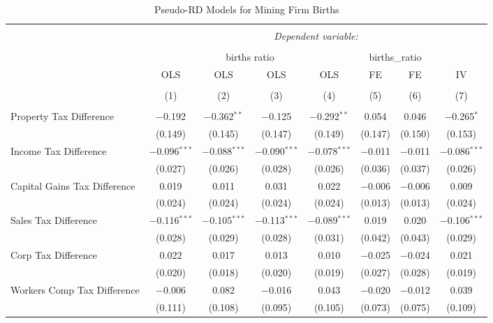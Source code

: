 
\begin{table}[!htbp] \centering 
  \caption{Pseudo-RD Models for  Mining Firm Births} 
  \label{} 
\begin{tabular}{@{\extracolsep{5pt}}lccccccc} 
\\[-1.8ex]\hline 
\hline \\[-1.8ex] 
 & \multicolumn{7}{c}{\textit{Dependent variable:}} \\ 
\cline{2-8} 
\\[-1.8ex] & \multicolumn{4}{c}{births ratio} & \multicolumn{2}{c}{births\_ratio} &   \\ 
 & OLS & OLS & OLS & OLS & FE & FE & IV \\ 
\\[-1.8ex] & (1) & (2) & (3) & (4) & (5) & (6) & (7)\\ 
\hline \\[-1.8ex] 
 Property Tax Difference & $-$0.192 & $-$0.362$^{**}$ & $-$0.125 & $-$0.292$^{**}$ & 0.054 & 0.046 & $-$0.265$^{*}$ \\ 
  & (0.149) & (0.145) & (0.147) & (0.149) & (0.147) & (0.150) & (0.153) \\ 
  Income Tax Difference & $-$0.096$^{***}$ & $-$0.088$^{***}$ & $-$0.090$^{***}$ & $-$0.078$^{***}$ & $-$0.011 & $-$0.011 & $-$0.086$^{***}$ \\ 
  & (0.027) & (0.026) & (0.028) & (0.026) & (0.036) & (0.037) & (0.026) \\ 
  Capital Gains Tax Difference & 0.019 & 0.011 & 0.031 & 0.022 & $-$0.006 & $-$0.006 & 0.009 \\ 
  & (0.024) & (0.024) & (0.024) & (0.024) & (0.013) & (0.013) & (0.024) \\ 
  Sales Tax Difference & $-$0.116$^{***}$ & $-$0.105$^{***}$ & $-$0.113$^{***}$ & $-$0.089$^{***}$ & 0.019 & 0.020 & $-$0.106$^{***}$ \\ 
  & (0.028) & (0.029) & (0.028) & (0.031) & (0.042) & (0.043) & (0.029) \\ 
  Corp Tax Difference & 0.022 & 0.017 & 0.013 & 0.010 & $-$0.025 & $-$0.024 & 0.021 \\ 
  & (0.020) & (0.018) & (0.020) & (0.019) & (0.027) & (0.028) & (0.019) \\ 
  Workers Comp Tax Difference & $-$0.006 & 0.082 & $-$0.016 & 0.043 & $-$0.020 & $-$0.012 & 0.039 \\ 
  & (0.111) & (0.108) & (0.095) & (0.105) & (0.073) & (0.075) & (0.109) \\ 

\end{tabular}
\end{table}
